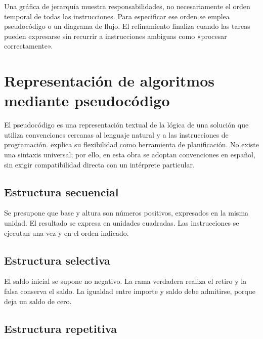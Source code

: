
Una gráfica de jerarquía muestra responsabilidades, no necesariamente el orden temporal de todas las instrucciones. Para especificar ese orden se emplea pseudocódigo o un diagrama de flujo. El refinamiento finaliza cuando las tareas pueden expresarse sin recurrir a instrucciones ambiguas como «procesar correctamente».

\section{Representación de algoritmos mediante pseudocódigo}

El pseudocódigo es una representación textual de la lógica de una solución que utiliza convenciones cercanas al lenguaje natural y a las instrucciones de programación. \textcite[pp.~14–15]{farrell2013} explica su flexibilidad como herramienta de planificación. No existe una sintaxis universal; por ello, en esta obra se adoptan convenciones en español, sin exigir compatibilidad directa con un intérprete particular.



\subsection{Estructura secuencial}


Se presupone que base y altura son números positivos, expresados en la misma unidad. El resultado se expresa en unidades cuadradas. Las instrucciones se ejecutan una vez y en el orden indicado.

\subsection{Estructura selectiva}


El saldo inicial se supone no negativo. La rama verdadera realiza el retiro y la falsa conserva el saldo. La igualdad entre importe y saldo debe admitirse, porque deja un saldo de cero.

\subsection{Estructura repetitiva}

